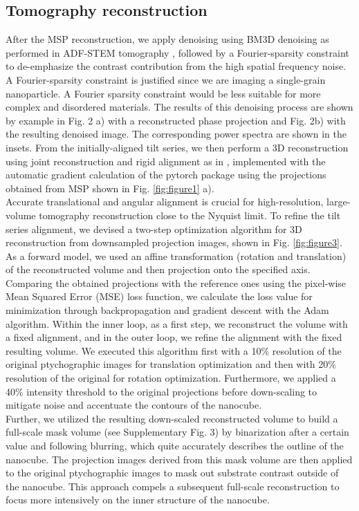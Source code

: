 \documentclass[12pt]{iopart}
\begin{document}
\subsection{Tomography reconstruction}
After the MSP reconstruction, we apply denoising using BM3D denoising as performed in ADF-STEM tomography \cite{AET_chen2013Wtip}, followed by a Fourier-sparsity constraint to de-emphasize the contrast contribution from the high spatial frequency noise. A Fourier-sparsity constraint is justified since we are imaging a single-grain nanoparticle. A Fourier sparsity constraint would be less suitable for more complex and disordered materials. The results of this denoising process are shown by example in Fig. 2 a) with a reconstructed phase projection and Fig. 2b) with the resulting denoised image. The corresponding power spectra are shown in the insets. 
From the initially-aligned tilt series, we then perform a 3D reconstruction using joint reconstruction and rigid alignment as in \cite{Pelz_2023}, implemented with the automatic gradient calculation of the pytorch package \cite{paszke2019pytorch} using the projections obtained from MSP shown in Fig. \ref{fig:figure1} a). \\
Accurate translational and angular alignment is crucial for high-resolution, large-volume tomography reconstruction close to the Nyquist limit. To refine the tilt series alignment, we devised a two-step optimization algorithm for 3D reconstruction from downsampled projection images, shown in Fig. \ref{fig:figure3}. As a forward model, we used an affine transformation (rotation and translation) of the reconstructed volume and then projection onto the specified axis. Comparing the obtained projections with the reference ones using the pixel-wise Mean Squared Error (MSE) loss function, we calculate the loss value for minimization through backpropagation and gradient descent with the Adam algorithm. Within the inner loop, as a first step, we reconstruct the volume with a fixed alignment, and in the outer loop, we refine the alignment with the fixed resulting volume. We executed this algorithm first with a 10\% resolution of the original ptychographic images for translation optimization and then with 20\% resolution of the original for rotation optimization. Furthermore, we applied a 40\% intensity threshold to the original projections before down-scaling to mitigate noise and accentuate the contours of the nanocube.\\
Further, we utilized the resulting down-scaled reconstructed volume to build a full-scale mask volume (see Supplementary Fig. 3) by binarization after a certain value and following blurring, which quite accurately describes the outline of the nanocube. The projection images derived from this mask volume are then applied to the original ptychographic images to mask out substrate contrast outside of the nanocube. This approach compels a subsequent full-scale reconstruction to focus more intensively on the inner structure of the nanocube.\\
\end{document}
